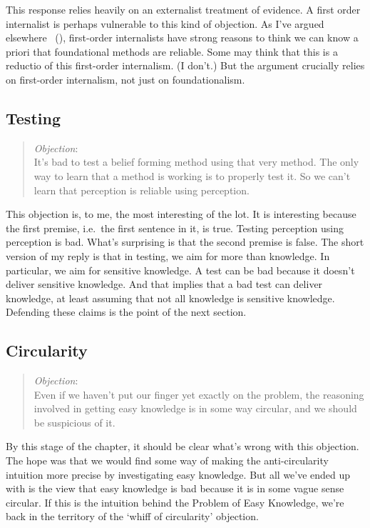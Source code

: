 \documentclass[
  10pt,
  letterpaper,
  twoside]{scrbook}
\begin{document}
This response relies heavily on an externalist treatment of evidence. A
first order internalist is perhaps vulnerable to this kind of objection.
As I've argued elsewhere ~(), first-order internalists have strong reasons to think we can
know a priori that foundational methods are reliable. Some may think
that this is a reductio of this first-order internalism. (I don't.) But
the argument crucially relies on first-order internalism, not just on
foundationalism.

\subsection{Testing}\label{testing}

\begin{quote}
\emph{Objection}:\\
It's bad to test a belief forming method using that very method. The
only way to learn that a method is working is to properly test it. So we
can't learn that perception is reliable using perception.
\end{quote}

This objection is, to me, the most interesting of the lot. It is
interesting because the first premise, i.e.~the first sentence in it, is
true. Testing perception using perception is bad. What's surprising is
that the second premise is false. The short version of my reply is that
in testing, we aim for more than knowledge. In particular, we aim for
sensitive knowledge. A test can be bad because it doesn't deliver
sensitive knowledge. And that implies that a bad test can deliver
knowledge, at least assuming that not all knowledge is sensitive
knowledge. Defending these claims is the point of the next section.

\subsection{Circularity}\label{circularity}

\begin{quote}
\emph{Objection}:\\
Even if we haven't put our finger yet exactly on the problem, the
reasoning involved in getting easy knowledge is in some way circular,
and we should be suspicious of it.
\end{quote}

By this stage of the chapter, it should be clear what's wrong with this
objection. The hope was that we would find some way of making the
anti-circularity intuition more precise by investigating easy knowledge.
But all we've ended up with is the view that easy knowledge is bad
because it is in some vague sense circular. If this is the intuition
behind the Problem of Easy Knowledge, we're back in the territory of the
`whiff of circularity' objection.
\end{document}
